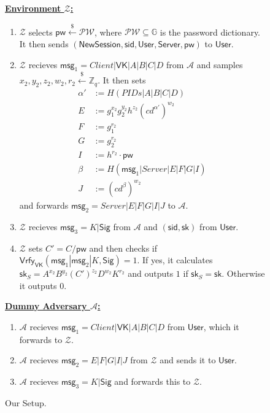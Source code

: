 \documentclass[12pt,a4paper]{article}
\newcommand{\env}{\mathcal{Z}}
\newcommand{\adv}{\mathcal{A}}
\newcommand{\user}{\mathsf{User}}
\newcommand{\sk}{\mathsf{sk}}
\newcommand{\pw}{\mathsf{pw}}
\newcommand{\newsession}{\mathsf{NewSession}}
\newcommand{\server}{\mathsf{Server}}
\newcommand{\msg}[1]{\mathsf{msg}_{#1}}
\begin{document}
	\begin{figure}[h]
		\begin{mdframed}[
			linecolor=black,
			linewidth=1pt,
			roundcorner=5pt,
			backgroundcolor=white,
			userdefinedwidth=\textwidth,
			]
			\vspace{2mm}
			\textbf{\underline{Environment $\env$:}}
			\begin{enumerate}
				\item $\env$ selects $\pw\xleftarrow{\$}\mathcal{PW}$, where $\mathcal{PW}\subseteq\mathbb{G}$ is the password dictionary. It then sends $(\newsession,\mathsf{sid},\user,\server,\pw)$ to $\user$.
				\item $\env$ recieves $\msg{1} = Client|\mathsf{VK}|A|B|C|D$ from $\adv$ and samples $x_2, y_2, z_2, w_2, r_2\xleftarrow{\$}\mathbb{Z}_q$. It then sets 
				\begin{align*}
					\alpha'&:=H(PIDs|A|B|C|D)\\
					E &:= g_1^{x_2}g_2^{y_2}h^{z_2}(cd^{\alpha'})^{w_2}\\
					F &:= g_1^{r_2}\\
					G &:= g_2^{r_2}\\
					I &:= h^{r_2}\cdot\pw\\
					\beta &:= H(\msg{1}|Server|E|F|G|I)\\
					J &:= (cd^{\beta})^{w_2}
				\end{align*}
			and forwards $\msg{2} = Server|E|F|G|I|J$ to $\adv$.
			\item $\env$ recieves $\msg{3}=K|\mathsf{Sig}$ from $\adv$ and $(\mathsf{sid}, \sk)$ from $\user$.
			\item $\env$ sets $C'=C/\pw$ and then checks if $\mathsf{Vrfy}_{\mathsf{VK}}(\msg{1}|\msg{2}|K,\mathsf{Sig})=1$. If yes, it calculates $\sk_S=A^{x_2}B^{y_2}(C')^{z_2}D^{w_2}K^{r_2}$ and outputs $1$ if $\sk_S=\sk$. Otherwise it outputs $0$.
			\end{enumerate}
			\textbf{\underline{Dummy Adversary $\adv$:}}
			\begin{enumerate}
				\item $\adv$ recieves $\msg{1} = Client|\mathsf{VK}|A|B|C|D$ from $\user$, which it forwards to $\env$.
				\item $\adv$ recieves $\msg{2}=E|F|G|I|J$ from $\env$ and sends it to $\user$.
				\item $\adv$ recieves $\msg{3}=K|\mathsf{Sig}$ and forwards this to $\env$.
			\end{enumerate}
			\vspace{2mm}
		\end{mdframed}
		\caption{Our Setup.}
		\label{fig:adv}
	\end{figure}
	
\end{document}
